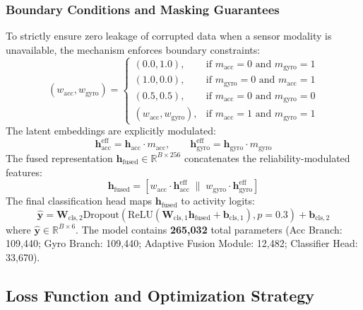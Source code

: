 \subsubsection{Boundary Conditions and Masking Guarantees}
To strictly ensure zero leakage of corrupted data when a sensor modality is unavailable, the mechanism enforces boundary constraints:
\begin{equation}
    (w_{\text{acc}}, w_{\text{gyro}}) = 
    \begin{cases}
        (0.0, 1.0), & \text{if } m_{\text{acc}} = 0 \text{ and } m_{\text{gyro}} = 1 \\
        (1.0, 0.0), & \text{if } m_{\text{gyro}} = 0 \text{ and } m_{\text{acc}} = 1 \\
        (0.5, 0.5), & \text{if } m_{\text{acc}} = 0 \text{ and } m_{\text{gyro}} = 0 \\
        (w_{\text{acc}}, w_{\text{gyro}}), & \text{if } m_{\text{acc}} = 1 \text{ and } m_{\text{gyro}} = 1
    \end{cases}
\end{equation}
The latent embeddings are explicitly modulated:
\begin{equation}
    \mathbf{h}_{\text{acc}}^{\text{eff}} = \mathbf{h}_{\text{acc}} \cdot m_{\text{acc}}, \qquad \mathbf{h}_{\text{gyro}}^{\text{eff}} = \mathbf{h}_{\text{gyro}} \cdot m_{\text{gyro}}
\end{equation}
The fused representation $\mathbf{h}_{\text{fused}} \in \mathbb{R}^{B \times 256}$ concatenates the reliability-modulated features:
\begin{equation}
    \mathbf{h}_{\text{fused}} = \left[ w_{\text{acc}} \cdot \mathbf{h}_{\text{acc}}^{\text{eff}} \;\|\; w_{\text{gyro}} \cdot \mathbf{h}_{\text{gyro}}^{\text{eff}} \right]
\end{equation}
The final classification head maps $\mathbf{h}_{\text{fused}}$ to activity logits:
\begin{equation}
    \hat{\mathbf{y}} = \mathbf{W}_{\text{cls}, 2} \text{Dropout}(\text{ReLU}(\mathbf{W}_{\text{cls}, 1} \mathbf{h}_{\text{fused}} + \mathbf{b}_{\text{cls}, 1}), p=0.3) + \mathbf{b}_{\text{cls}, 2}
\end{equation}
where $\hat{\mathbf{y}} \in \mathbb{R}^{B \times 6}$. The model contains \textbf{265,032} total parameters (Acc Branch: 109,440; Gyro Branch: 109,440; Adaptive Fusion Module: 12,482; Classifier Head: 33,670).

\subsection{Loss Function and Optimization Strategy}
\label{subsec:loss_and_optimizer}

